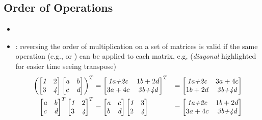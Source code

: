 \begin{itemize}
  \subsection{Order of Operations}\label{Order of Operations}
  \begin{itemize}
    \item {}
    \item {}: reversing the order of multiplication on a set of matrices is valid if the same operation (e.g., \hyperref[Transposition]{} or \hyperref[Matrix Inverse]{}) can be applied to each matrix, e.g, (\emph{diagonal} highlighted for easier time seeing transpose)
    \begin{align*}
    \begin{pmatrix}
      \begin{bmatrix} \emph{1} & 2 \\ 3 & \emph{4} \end{bmatrix}
      \begin{bmatrix} \emph{a} & b \\ c & \emph{d} \end{bmatrix}
    \end{pmatrix}^T
    &=
    \begin{bmatrix}
      \emph{1a+2c} & 1b+2d \\ 3a+4c & \emph{3b+4d} 
    \end{bmatrix}^T
    &= 
    \begin{bmatrix}
      \emph{1a+2c} & 3a+4c \\ 1b+2d & \emph{3b+4d} 
    \end{bmatrix}
    \\
    \begin{bmatrix} \emph{a} & b \\ c & \emph{d} \end{bmatrix}^T
    \begin{bmatrix} \emph{1} & 2 \\ 3 & \emph{4} \end{bmatrix}^T
    &=
    \begin{bmatrix} \emph{a} & c \\ b & \emph{d} \end{bmatrix}
    \begin{bmatrix} \emph{1} & 3 \\ 2 & \emph{4} \end{bmatrix}
    &=
    \begin{bmatrix}
      \emph{1a+2c} & 1b+2d \\ 3a+4c & \emph{3b+4d} 
    \end{bmatrix}
    \end{align*}
  \end{itemize}
  

\end{itemize}
